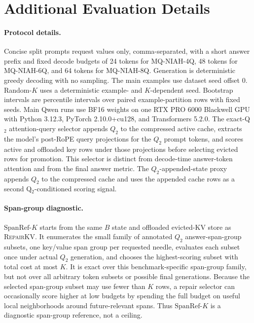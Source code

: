 \documentclass{article}
\newcommand{\repairkv}{\textsc{RepairKV}}
\newcommand{\spanref}{\ensuremath{\mathrm{SpanRef}\mbox{-}K}}
\begin{document}
\section{Additional Evaluation Details}
\label{app:evaluation-details}

\paragraph{Protocol details.}
Concise split prompts request values only, comma-separated, with a short
answer prefix and fixed decode budgets of 24 tokens for MQ-NIAH-4Q,
48 tokens for MQ-NIAH-6Q, and 64 tokens for MQ-NIAH-8Q.
Generation is deterministic greedy decoding with no sampling.
The main examples use dataset seed offset 0.
Random-$K$ uses a
deterministic example- and $K$-dependent seed.
Bootstrap intervals are percentile intervals over paired
example-partition rows with fixed seeds.
Main Qwen runs use BF16 weights on one RTX PRO 6000 Blackwell GPU with
Python 3.12.3, PyTorch 2.10.0+cu128, and Transformers 5.2.0.
The exact-Q$_2$ attention-query selector appends $Q_2$ to
the compressed active cache, extracts the model's post-RoPE query
projections for the $Q_2$ prompt tokens, and scores active and offloaded
key rows under those projections before selecting evicted rows for
promotion. This selector is distinct from decode-time answer-token
attention and from the final answer metric. The $Q_2$-appended-state proxy
appends $Q_2$ to the compressed cache and uses the appended cache rows as
a second Q$_2$-conditioned scoring signal.

\paragraph{Span-group diagnostic.}
\spanref{} starts from the same $B$ state and offloaded evicted-KV store
as \repairkv{}.
It enumerates the small family of annotated $Q_2$ answer-span-group
subsets, one key/value span group per requested needle, evaluates each
subset once under actual $Q_2$ generation, and chooses the
highest-scoring subset with total cost at most $K$.
It is exact over this benchmark-specific span-group family, but not over
all arbitrary token subsets or possible final generations.
Because the selected span-group subset may use fewer than $K$ rows, a
repair selector can occasionally score higher at low budgets by spending
the full budget on useful local neighborhoods around future-relevant
spans. Thus \spanref{} is a diagnostic span-group reference, not a
ceiling. 
\end{document}
